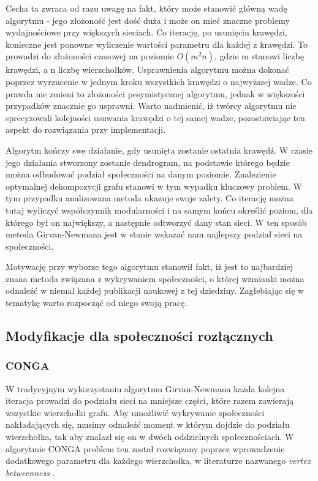 \documentclass{article}
\begin{document}
Cecha ta zwraca od razu uwagę na fakt, który może stanowić główną wadę algorytmu - jego złożoność jest dość duża i może on mieć znaczne problemy wydajnościowe przy większych sieciach. Co iterację, po usunięciu krawędzi, konieczne jest ponowne wyliczenie wartości parametru dla każdej z krawędzi. To prowadzi do złożoności czasowej na poziomie $O({m}^2n)$, gdzie m stanowi liczbę krawędzi, a n liczbę wierzchołków. Usprawnienia algorytmu można dokonać poprzez wyrzucenie w jednym kroku wszystkich krawędzi o najwyższej wadze. Co prawda nie zmieni to złożoności pesymistycznej algorytmu, jednak w większości przypadków znacznie go usprawni. Warto nadmienić, iż twórcy algorytmu nie sprecyzowali kolejności usuwania krawędzi o tej samej wadze, pozostawiając ten aspekt do rozwiązania przy implementacji.

Algorytm kończy swe działanie, gdy usunięta zostanie ostatnia krawędź. W czasie jego działania stworzony zostanie dendrogram, na podstawie którego będzie można odbudować podział społeczności na danym poziomie. Znalezienie optymalnej dekompozycji grafu stanowi w tym wypadku kluczowy problem. W tym przypadku analizowana metoda ukazuje swoje zalety. Co iterację można tutaj wyliczyć współczynnik modularności i na samym końcu określić poziom, dla którego był on największy, a następnie odtworzyć dany stan sieci. W ten sposób metoda Girvan-Newmana jest w stanie wskazać nam najlepszy podział sieci na społeczności.

Motywację przy wyborze tego algorytmu stanowił fakt, iż jest to najbardziej znana metoda związana z wykrywaniem społeczności, o której wzmianki można odnaleźć w niemal każdej publikacji naukowej z tej dziedziny. Zagłebiając się w tematykę warto rozpocząć od niego swoją pracę. 
\subsection{Modyfikacje dla społeczności rozłącznych}
\subsubsection{CONGA}
W tradycyjnym wykorzystaniu algorytmu Girvan-Newmana każda kolejna iteracja prowadzi do podziału sieci na mniejsze części, które razem zawierają wszystkie wierzchołki grafu. Aby umożliwić wykrywanie społeczności nakładających się, musimy odnaleźć moment w którym dojdzie do podziału wierzchołka, tak aby znalazł się on w dwóch oddzielnych społecznościach. W algorytmie CONGA problem ten został rozwiązany poprzez wprowadzenie dodatkowego parametru dla każdego wierzchołka, w literaturze nazwanego \textit{vertex betweenness} \cite{is-paper2}.
\end{document}
